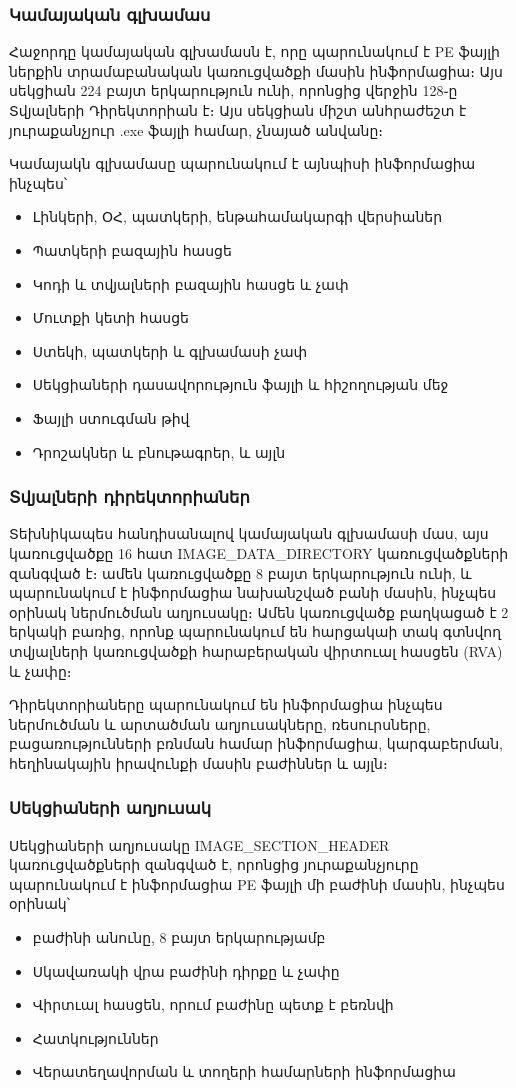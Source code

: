 \documentclass[12pt]{article}
\begin{document}
\begin{sloppypar}
\subsubsection{Կամայական գլխամաս}
Հաջորդը կամայական գլխամասն է, որը պարունակում է PE ֆայլի ներքին տրամաբանական
կառուցվածքի մասին ինֆորմացիա։ Այս սեկցիան 224 բայտ երկարություն ունի, որոնցից
վերջին 128֊ը Տվյալների Դիրեկտորիան է։ Այս սեկցիան միշտ անհրաժեշտ է
յուրաքանչյուր .exe ֆայլի համար, չնայած անվանը։

Կամայակն գլխամասը պարունակում է այնպիսի ինֆորմացիա ինչպես՝

\begin{itemize}
\item Լինկերի, ՕՀ, պատկերի, ենթահամակարգի վերսիաներ
\item Պատկերի բազային հասցե
\item Կոդի և տվյալների բազային հասցե և չափ
\item Մուտքի կետի հասցե
\item Ստեկի, պատկերի և գլխամասի չափ
\item Սեկցիաների դասավորություն ֆայլի և հիշողության մեջ
\item Ֆայլի ստուգման թիվ
\item Դրոշակներ և բնութագրեր, և այլն
\end{itemize}

\subsubsection{Տվյալների դիրեկտորիաներ}
Տեխնիկապես հանդիսանալով կամայական գլխամասի մաս, այս կառուցվածքը
16 հատ IMAGE\_DATA\_DIRECTORY կառուցվածքների զանգված է։ ամեն կառուցվածքը
8 բայտ երկարություն ունի, և պարունակում է ինֆորմացիա նախանշված բանի մասին,
ինչպես օրինակ ներմուծման աղյուսակը։ Ամեն կառուցվածք բաղկացած է 2 երկակի
բառից, որոնք պարունակում են հարցակաի տակ գտնվող տվյալների կառուցվածքի
հարաբերական վիրտուալ հասցեն (RVA) և չափը։

Դիրեկտորիաները պարունակում են ինֆորմացիա ինչպես ներմուծման և արտածման
աղյուսակները, ռեսուրսները, բացառությունների բռնման համար ինֆորմացիա,
կարգաբերման, հեղինակային իրավունքի մասին բաժիններ և այլն։

\subsubsection{Սեկցիաների աղյուսակ}
Սեկցիաների աղյուսակը IMAGE\_SECTION\_HEADER կառուցվածքների զանգված է, որոնցից
յուրաքանչյուրը պարունակում է ինֆորմացիա PE ֆայլի մի բաժինի մասին,
ինչպես օրինակ՝
\begin{itemize}
\item բաժինի անունը, 8 բայտ երկարությամբ
\item Սկավառակի վրա բաժինի դիրքը և չափը
\item Վիրտւալ հասցեն, որում բաժինը պետք է բեռնվի
\item Հատկություններ
\item Վերատեղավորման և տողերի համարների ինֆորմացիա
\end{itemize}


\end{sloppypar}
\end{document}
